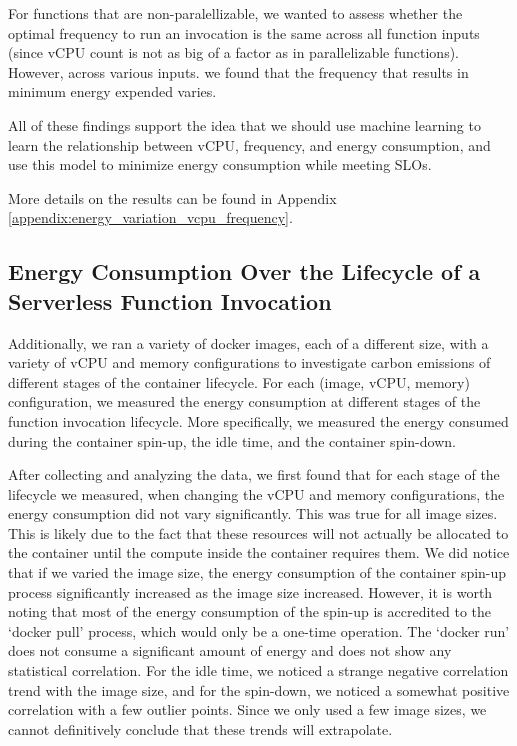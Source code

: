 \documentclass[times, 10pt,twocolumn]{article}
\begin{document}
For functions that are non-paralellizable, we wanted to assess whether the optimal frequency to run an invocation is the same across all function inputs (since vCPU count is not as big of a factor as in parallelizable functions). However, across various inputs. we found that the frequency that results in minimum energy expended varies. 

All of these findings support the idea that we should use machine learning to learn the relationship between vCPU, frequency, and energy consumption, and use this model to minimize energy consumption while meeting SLOs.

More details on the results can be found in Appendix \ref{appendix:energy_variation_vcpu_frequency}.

\subsection{Energy Consumption Over the Lifecycle of a Serverless Function Invocation}
Additionally, we ran a variety of docker images, each of a different size, with a variety of vCPU and memory configurations to investigate carbon emissions of different stages of the container lifecycle. For each (image, vCPU, memory) configuration, we measured the energy consumption at different stages of the function invocation lifecycle. More specifically, we measured the energy consumed during the container spin-up, the idle time, and the container spin-down.

After collecting and analyzing the data, we first found that for each stage of the lifecycle we measured, when changing the vCPU and memory configurations, the energy consumption did not vary significantly. This was true for all image sizes. This is likely due to the fact that these resources will not actually be allocated to the container until the compute inside the container requires them. We did notice that if we varied the image size, the energy consumption of the container spin-up process significantly increased as the image size increased. However, it is worth noting that most of the energy consumption of the spin-up is accredited to the `docker pull' process, which would only be a one-time operation. The `docker run' does not consume a significant amount of energy and does not show any statistical correlation. For the idle time, we noticed a strange negative correlation trend with the image size, and for the spin-down, we noticed a somewhat positive correlation with a few outlier points. Since we only used a few image sizes, we cannot definitively conclude that these trends will extrapolate.
\end{document}
